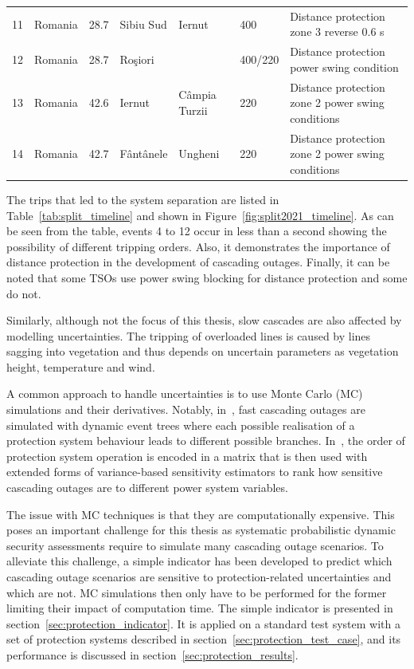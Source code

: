 \begin{table}
\begin{adjustbox}{max width=\textwidth}
\begin{tabular}{@{}lllllll@{}}
11 & Romania & 28.7      & Sibiu Sud    & Iernut         & 400          & Distance protection zone 3 reverse 0.6 s               \\
12 & Romania & 28.7      & Roşiori      &                & 400/220      & Distance protection power swing condition              \\
13 & Romania & 42.6 & Iernut & Câmpia Turzii & 220 & Distance protection zone 2 power swing conditions \\
14 & Romania & 42.7      & Fântânele    & Ungheni        & 220          & Distance protection zone 2 power swing conditions      \\ \bottomrule
\end{tabular}
\end{adjustbox}
\end{table}

The trips that led to the system separation are listed in Table~\ref{tab:split_timeline} and shown in Figure~\ref{fig:split2021_timeline}. As can be seen from the table, events 4 to 12 occur in less than a second showing the possibility of different tripping orders. Also, it demonstrates the importance of distance protection in the development of cascading outages. Finally, it can be noted that some TSOs use power swing blocking for distance protection and some do not.

Similarly, although not the focus of this thesis, slow cascades are also affected by modelling uncertainties. The tripping of overloaded lines is caused by lines sagging into vegetation and thus depends on uncertain parameters as vegetation height, temperature and wind. %

A common approach to handle uncertainties is to use Monte Carlo (MC) simulations and their derivatives. Notably, in~\cite{TwoLevelPSA}, fast cascading outages are simulated with dynamic event trees where each possible realisation of a protection system behaviour leads to different possible branches. In~\cite{SequencesRelaySobol}, the order of protection system operation is encoded in a matrix that is then used with extended forms of variance-based sensitivity estimators to rank how sensitive cascading outages are to different power system variables.

The issue with MC techniques is that they are computationally expensive. This poses an important challenge for this thesis as systematic probabilistic dynamic security assessments require to simulate many cascading outage scenarios. To alleviate this challenge, a simple indicator has been developed to predict which cascading outage scenarios are sensitive to protection-related uncertainties and which are not. MC simulations then only have to be performed for the former limiting their impact of computation time. The simple indicator is presented in section~\ref{sec:protection_indicator}. It is applied on a standard test system with a set of protection systems described in section~\ref{sec:protection_test_case}, and its performance is discussed in section~\ref{sec:protection_results}.


